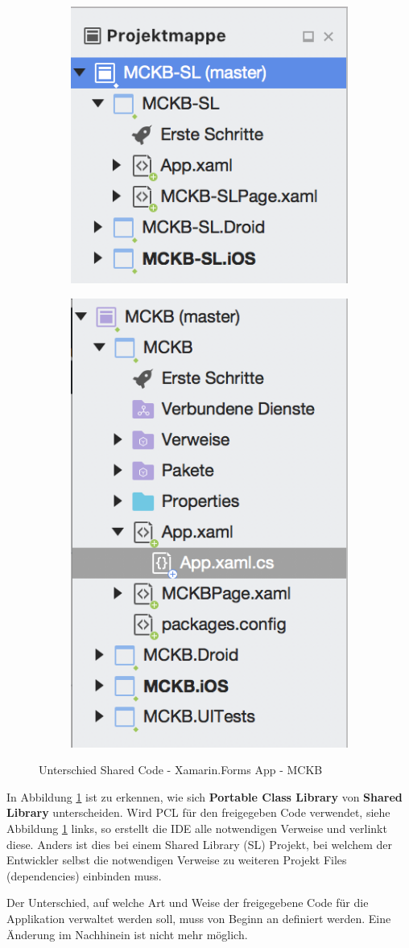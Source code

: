 	\newpage
	\begin{figure}[h!]
		\centering
		\begin{subfigure}
			\centering
			\includegraphics[width=.3\textwidth]{images/xamarin-shared-library.png}
		\end{subfigure}
		\begin{subfigure}
			\centering
			\includegraphics[width=.3\textwidth]{images/xamarin-portable-class.png}
		\end{subfigure}
		\caption{Unterschied Shared Code - Xamarin.Forms App - MCKB}
		\label{fig:xamarinsharedcode}
	\end{figure}

	In Abbildung \ref{fig:xamarinsharedcode} ist zu erkennen, wie sich \textbf{Portable Class Library} von \textbf{Shared Library} unterscheiden. Wird PCL für den freigegeben Code verwendet, siehe Abbildung \ref{fig:xamarinsharedcode} links, so erstellt die IDE alle notwendigen Verweise und verlinkt diese. Anders ist dies bei einem Shared Library (SL) Projekt, bei welchem der Entwickler selbst die notwendigen Verweise zu weiteren Projekt Files (dependencies) einbinden muss.

	Der Unterschied, auf welche Art und Weise der freigegebene Code für die Applikation verwaltet werden soll, muss von Beginn an definiert werden. Eine Änderung im Nachhinein ist nicht mehr möglich.

